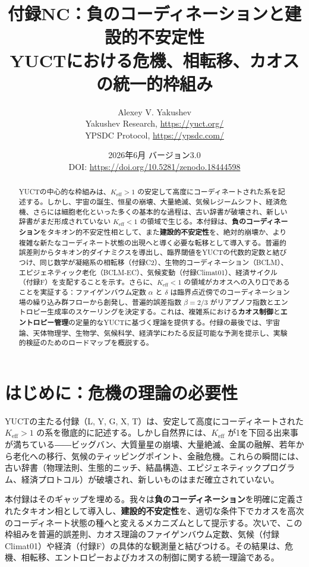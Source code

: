 \documentclass[12pt,a4paper]{article}
\title{\Huge\textbf{付録NC：負のコーディネーションと建設的不安定性}\\[0.3cm]
	\Large YUCTにおける危機、相転移、カオスの統一的枠組み}
\author{Alexey V. Yakushev \\ 
	Yakushev Research, \url{https://yuct.org/} \\ 
	YPSDC Protocol, \url{https://ypsdc.com/}}
\date{2026年6月 \quad バージョン3.0 \\ \medskip
	DOI: \url{https://doi.org/10.5281/zenodo.18444598}}
\newcommand{\Keff}{K_{\mathrm{eff}}}
\begin{document}
	
	\maketitle
	
	\begin{abstract}
		YUCTの中心的な枠組みは、\(\Keff > 1\) の安定して高度にコーディネートされた系を記述する。しかし、宇宙の誕生、恒星の崩壊、大量絶滅、気候レジームシフト、経済危機、さらには細胞老化といった多くの基本的な過程は、古い辞書が破壊され、新しい辞書がまだ形成されていない \(\Keff < 1\) の領域で生じる。本付録は、\textbf{負のコーディネーション}をタキオン的不安定性相として、また\textbf{建設的不安定性}を、絶対的崩壊か、より複雑な新たなコーディネート状態の出現へと導く必要な転移として導入する。普遍的誤差則からタキオン的ダイナミクスを導出し、臨界閾値をYUCTの代数的定数と結びつけ、同じ数学が凝縮系の相転移（付録C2）、生物的コーディネーション（BCLM）、エピジェネティック老化（BCLM‑EC）、気候変動（付録Climat01）、経済サイクル（付録F）を支配することを示す。さらに、\(\Keff < 1\) の領域がカオスへの入り口であることを実証する：ファイゲンバウム定数 \(\alpha\) と \(\delta\) は臨界点近傍でのコーディネーション場の繰り込み群フローから創発し、普遍的誤差指数 \(\beta = 2/3\) がリアプノフ指数とエントロピー生成率のスケーリングを決定する。これは、複雑系における\textbf{カオス制御}と\textbf{エントロピー管理}の定量的なYUCTに基づく理論を提供する。付録の最後では、宇宙論、天体物理学、生物学、気候科学、経済学にわたる反証可能な予測を提示し、実験的検証のためのロードマップを概説する。
	\end{abstract}
	
	\tableofcontents
	\newpage
	
	\section{はじめに：危機の理論の必要性}
	
	YUCTの主たる付録（L, Y, G, X, T）は、安定して高度にコーディネートされた \(\Keff > 1\) の系を徹底的に記述する。しかし自然界には、\(\Keff\) が1を下回る出来事が満ちている――ビッグバン、大質量星の崩壊、大量絶滅、金属の融解、若年から老化への移行、気候のティッピングポイント、金融危機。これらの瞬間には、古い辞書（物理法則、生態的ニッチ、結晶構造、エピジェネティックプログラム、経済プロトコル）が破壊され、新しいものはまだ確立されていない。
	
	本付録はそのギャップを埋める。我々は\textbf{負のコーディネーション}を明確に定義されたタキオン相として導入し、\textbf{建設的不安定性}を、適切な条件下でカオスを高次のコーディネート状態の種へと変えるメカニズムとして提示する。次いで、この枠組みを普遍的誤差則、カオス理論のファイゲンバウム定数、気候（付録Climat01）や経済（付録F）の具体的な観測量と結びつける。その結果は、危機、相転移、エントロピーおよびカオスの制御に関する統一理論である。
	
\end{document}
